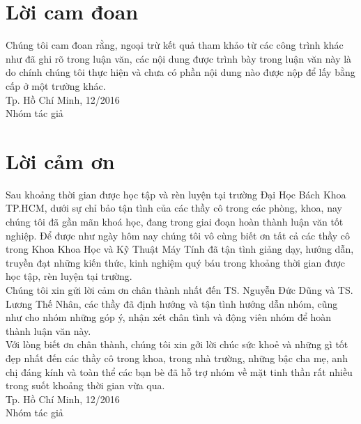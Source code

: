 \documentclass[12pt,a4paper,oneside]{extbook}
\begin{document}
\chapter*{Lời cam đoan}

Chúng tôi cam đoan rằng, ngoại trừ kết quả tham khảo từ các công trình khác như đã ghi rõ trong luận văn, các nội dung được trình bày trong luận văn này là do chính chúng tôi thực hiện và chưa có phần nội dung nào được nộp để lấy bằng cấp ở một trường khác.\\

\hspace{10cm}Tp. Hồ Chí Minh, 12/2016\\

\hspace{11cm}Nhóm tác giả

\chapter*{Lời cảm ơn}
Sau khoảng thời gian được học tập và rèn luyện tại trường Đại Học Bách Khoa TP.HCM, dưới sự chỉ bảo tận tình của các thầy cô trong các phòng, khoa, nay chúng tôi đã gần mãn khoá học, đang trong giai đoạn hoàn thành luận văn tốt nghiệp. Để được như ngày hôm nay chúng tôi vô cùng biết ơn tất cả các thầy cô trong Khoa Khoa Học và Kỹ Thuật Máy Tính đã tận tình giảng dạy, hướng dẫn, truyền đạt những kiến thức, kinh nghiệm quý báu trong khoảng thời gian được học tập, rèn luyện tại trường.\\

\noindent
Chúng tôi xin gửi lời cảm ơn chân thành nhất đến TS. Nguyễn Đức Dũng và TS. Lương Thế Nhân, các thầy đã định hướng và tận tình hướng dẫn nhóm, cũng như cho nhóm những góp ý, nhận xét chân tình và động viên nhóm để hoàn thành luận văn này.\\

\noindent
Với lòng biết ơn chân thành, chúng tôi xin gởi lời chúc sức khoẻ và những gì tốt đẹp nhất đến các thầy cô trong khoa, trong nhà trường, những bậc cha mẹ, anh chị đáng kính và toàn thể các bạn bè đã hỗ trợ nhóm về mặt tinh thần rất nhiều trong suốt khoảng thời gian vừa qua.\\

\hspace{10cm}Tp. Hồ Chí Minh, 12/2016\\

\hspace{11cm}Nhóm tác giả
\end{document}
